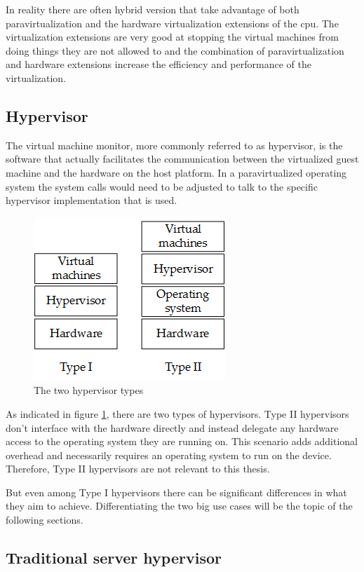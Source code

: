 In reality there are often hybrid version that take advantage of both paravirtualization and the hardware virtualization extensions of the \acrshort{cpu}. The virtualization extensions are very good at stopping the virtual machines from doing things they are not allowed to and the combination of paravirtualization and hardware extensions increase the efficiency and performance of the virtualization.
\subsection{Hypervisor}
The virtual machine monitor, more commonly referred to as hypervisor, is the software that actually facilitates the communication between the virtualized guest machine and the hardware on the host platform. In a paravirtualized operating system the system calls would need to be adjusted to talk to the specific hypervisor implementation that is used. 

\begin{figure}
\centering
\includegraphics[scale=0.75]{Figures/hypervisor_types.png}
\decoRule
\caption{The two hypervisor types}
\label{fig:hypervisor_types}
\end{figure}
As indicated in figure \ref{fig:hypervisor_types}, there are two types of hypervisors. Type II hypervisors don't interface with the hardware directly and instead delegate any hardware access to the operating system they are running on. This scenario adds additional overhead and necessarily requires an operating system to run on the device. Therefore, Type II hypervisors are not relevant to this thesis.

But even among Type I hypervisors there can be significant differences in what they aim to achieve. Differentiating the two big use cases will be the topic of the following sections.
\subsection{Traditional server hypervisor}
